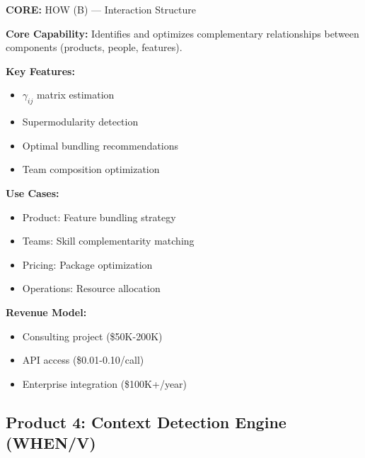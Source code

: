 \begin{tcolorbox}[colback=yellow!5!white, colframe=yellow!75!black,
    title=Product: Complementarity Optimizer]

\textbf{CORE:} HOW (B) --- Interaction Structure

\textbf{Core Capability:}
Identifies and optimizes complementary relationships between components (products, people, features).

\textbf{Key Features:}
\begin{itemize}[nosep]
\item $\gamma_{ij}$ matrix estimation
\item Supermodularity detection
\item Optimal bundling recommendations
\item Team composition optimization
\end{itemize}

\textbf{Use Cases:}
\begin{itemize}[nosep]
\item Product: Feature bundling strategy
\item Teams: Skill complementarity matching
\item Pricing: Package optimization
\item Operations: Resource allocation
\end{itemize}

\textbf{Revenue Model:}
\begin{itemize}[nosep]
\item Consulting project (\$50K-200K)
\item API access (\$0.01-0.10/call)
\item Enterprise integration (\$100K+/year)
\end{itemize}

\end{tcolorbox}


\subsection{Product 4: Context Detection Engine (WHEN/V)}

